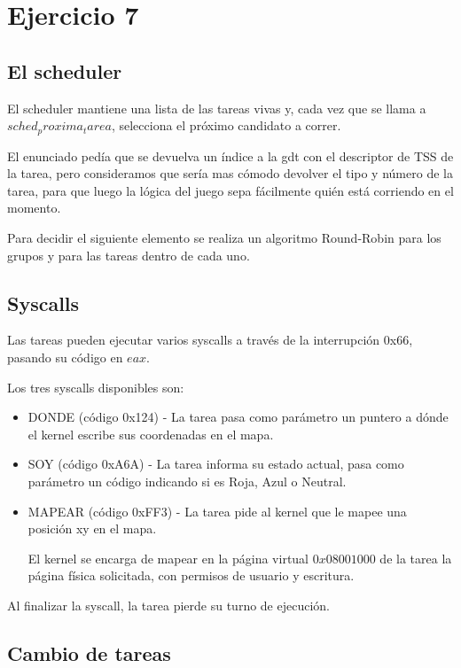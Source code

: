 \section{Ejercicio 7}

\subsection{El scheduler}

El scheduler mantiene una lista de las tareas vivas y, cada vez que se llama a $sched_proxima_tarea$,
selecciona el próximo candidato a correr.

El enunciado pedía que se devuelva un índice a la gdt con el descriptor de TSS de la tarea,
pero consideramos que sería mas cómodo devolver el tipo y número de la tarea, para que luego
la lógica del juego sepa fácilmente quién está corriendo en el momento.

Para decidir el siguiente elemento se realiza un algoritmo Round-Robin para los grupos y
para las tareas dentro de cada uno.

\subsection{Syscalls}
\label{syscalls}

Las tareas pueden ejecutar varios syscalls a través de la interrupción 0x66,
pasando su código en $eax$.

Los tres syscalls disponibles son:

\begin{itemize}
    \item DONDE (código 0x124) - La tarea pasa como parámetro un puntero a dónde
        el kernel escribe sus coordenadas en el mapa.
    \item SOY (código 0xA6A) - La tarea informa su estado actual,
        pasa como parámetro un código indicando si es Roja, Azul o Neutral.
    \item MAPEAR (código 0xFF3) - La tarea pide al kernel que le mapee una posición xy en el mapa.

        El kernel se encarga de mapear en la página virtual $0x08001000$ de la tarea
        la página física solicitada, con permisos de usuario y escritura.
\end{itemize}

Al finalizar la syscall, la tarea pierde su turno de ejecución.

\subsection{Cambio de tareas}

